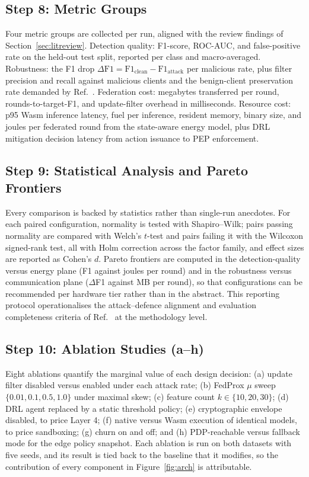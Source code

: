 \documentclass[11pt,a4paper]{article}
\begin{document}
\subsection{Step 8: Metric Groups}\label{sec:step8}

Four metric groups are collected per run, aligned with the review findings
of Section~\ref{sec:litreview}. Detection quality: F1-score, ROC-AUC, and
false-positive rate on the held-out test split, reported per class and
macro-averaged. Robustness: the F1 drop
$\Delta \mathrm{F1} = \mathrm{F1}_{\text{clean}} -
\mathrm{F1}_{\text{attack}}$ per malicious rate, plus filter precision and
recall against malicious clients and the benign-client preservation rate
demanded by Ref.~\cite{djemaa2026}. Federation cost: megabytes
transferred per round, rounds-to-target-F1, and update-filter overhead in
milliseconds. Resource cost: p95 Wasm inference latency, fuel per
inference, resident memory, binary size, and joules per federated round
from the state-aware energy model, plus DRL mitigation decision latency
from action issuance to PEP enforcement.

\subsection{Step 9: Statistical Analysis and Pareto Frontiers}
\label{sec:stats}

Every comparison is backed by statistics rather than single-run anecdotes.
For each paired configuration, normality is tested with Shapiro--Wilk;
pairs passing normality are compared with Welch's $t$-test and pairs
failing it with the Wilcoxon signed-rank test, all with Holm correction
across the factor family, and effect sizes are reported as Cohen's $d$.
Pareto frontiers are computed in the detection-quality versus energy plane
(F1 against joules per round) and in the robustness versus communication
plane ($\Delta$F1 against MB per round), so that configurations can be
recommended per hardware tier rather than in the abstract. This reporting
protocol operationalises the attack--defence alignment and evaluation
completeness criteria of Ref.~\cite{djemaa2026} at the methodology level.

\subsection{Step 10: Ablation Studies (a--h)}\label{sec:step10}

Eight ablations quantify the marginal value of each design decision:
(a) update filter disabled versus enabled under each attack rate;
(b) FedProx $\mu$ sweep $\{0.01, 0.1, 0.5, 1.0\}$ under maximal skew;
(c) feature count $k \in \{10, 20, 30\}$; (d) DRL agent replaced by a
static threshold policy; (e) cryptographic envelope disabled, to price
Layer 4; (f) native versus Wasm execution of identical models, to price
sandboxing; (g) churn on and off; and (h) PDP-reachable versus fallback
mode for the edge policy snapshot. Each ablation is run on both datasets
with five seeds, and its result is tied back to the baseline that it
modifies, so the contribution of every component in
Figure~\ref{fig:arch} is attributable.
\end{document}
